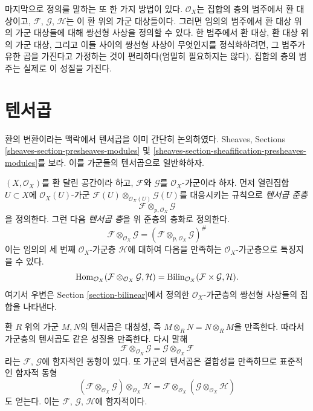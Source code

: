 \medskip\noindent
마지막으로 정의를 말하는 또 한 가지 방법이 있다. $\mathcal{O}_X$는
집합의 층의 범주에서 환 대상이고, $\mathcal{F}$, $\mathcal{G}$,
$\mathcal{H}$는 이 환 위의 가군 대상들이다. 그러면 임의의 범주에서
환 대상 위의 가군 대상들에 대해 쌍선형 사상을 정의할 수 있다.
한 범주에서 환 대상, 환 대상 위의 가군 대상, 그리고 이들 사이의
쌍선형 사상이 무엇인지를 정식화하려면, 그 범주가 유한 곱을 가진다고
가정하는 것이 편리하다(엄밀히 필요하지는 않다). 집합의 층의 범주는
실제로 이 성질을 가진다.







\section{텐서곱}
\label{section-tensor-product}

\noindent
환의 변환이라는 맥락에서 텐서곱을 이미 간단히 논의하였다. Sheaves, Sections
\ref{sheaves-section-presheaves-modules} 및
\ref{sheaves-section-sheafification-presheaves-modules}를 보라.
이를 가군들의 텐서곱으로 일반화하자.

\medskip\noindent
$(X, \mathcal{O}_X)$를 환 달린 공간이라 하고,
$\mathcal{F}$와 $\mathcal{G}$를 $\mathcal{O}_X$-가군이라 하자.
먼저 열린집합 $U \subset X$에 $\mathcal{O}_X(U)$-가군
$\mathcal{F}(U) \otimes_{\mathcal{O}_X(U)} \mathcal{G}(U)$를 대응시키는
규칙으로 {\it 텐서곱 준층}
$$
\mathcal{F} \otimes_{p, \mathcal{O}_X} \mathcal{G}
$$
을 정의한다. 그런 다음 {\it 텐서곱 층}을 위 준층의 층화로 정의한다.
$$
\mathcal{F} \otimes_{\mathcal{O}_X} \mathcal{G}
=
(\mathcal{F} \otimes_{p, \mathcal{O}_X} \mathcal{G})^\#
$$
이는 임의의 세 번째 $\mathcal{O}_X$-가군층 $\mathcal{H}$에 대하여
다음을 만족하는 $\mathcal{O}_X$-가군층으로 특징지을 수 있다.
$$
\mathop{\mathrm{Hom}}\nolimits_{\mathcal{O}_X}
(\mathcal{F} \otimes_{\mathcal{O}_X} \mathcal{G}, \mathcal{H})
=
\text{Bilin}_{\mathcal{O}_X}(\mathcal{F} \times \mathcal{G}, \mathcal{H}).
$$
여기서 우변은 Section \ref{section-bilinear}에서 정의한
$\mathcal{O}_X$-가군층의 쌍선형 사상들의 집합을 나타낸다.

\medskip\noindent
환 $R$ 위의 가군 $M, N$의 텐서곱은 대칭성, 즉
$M \otimes_R N = N \otimes_R M$을 만족한다. 따라서 가군층의 텐서곱도
같은 성질을 만족한다. 다시 말해
$$
\mathcal{F} \otimes_{\mathcal{O}_X} \mathcal{G}
=
\mathcal{G} \otimes_{\mathcal{O}_X} \mathcal{F}
$$
라는 $\mathcal{F}$, $\mathcal{G}$에 함자적인 동형이 있다.
또 가군의 텐서곱은 결합성을 만족하므로 표준적인 함자적 동형
$$
(\mathcal{F} \otimes_{\mathcal{O}_X} \mathcal{G})
\otimes_{\mathcal{O}_X} \mathcal{H}
=
\mathcal{F} \otimes_{\mathcal{O}_X}
(\mathcal{G} \otimes_{\mathcal{O}_X} \mathcal{H})
$$
도 얻는다. 이는 $\mathcal{F}$, $\mathcal{G}$, $\mathcal{H}$에 함자적이다.


